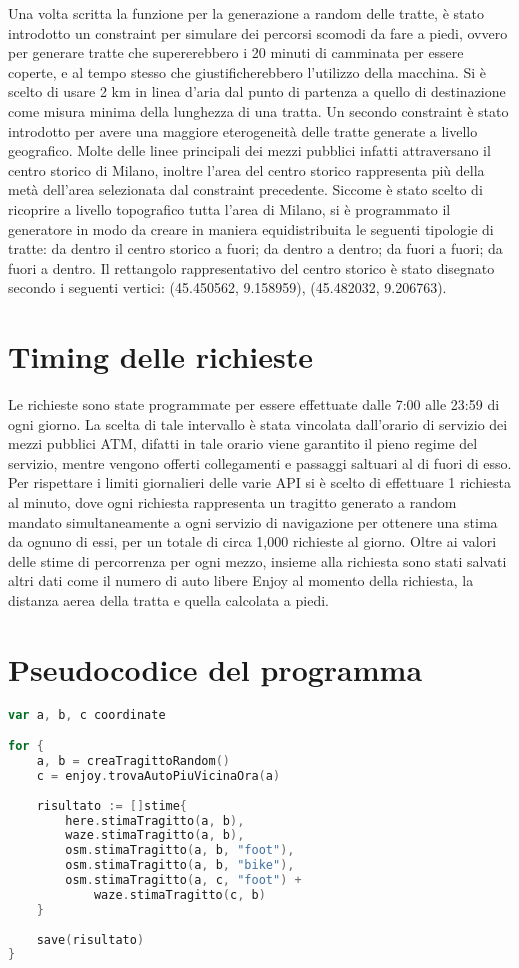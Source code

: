 Una volta scritta la funzione per la generazione a random delle tratte, è stato introdotto un constraint per simulare dei percorsi scomodi da fare a piedi, ovvero per generare tratte che supererebbero i 20 minuti di camminata per essere coperte, e al tempo stesso che giustificherebbero l'utilizzo della macchina. Si è scelto di usare 2 km in linea d'aria dal punto di partenza a quello di destinazione come misura minima della lunghezza di una tratta. Un secondo constraint è stato introdotto per avere una maggiore eterogeneità delle tratte generate a livello geografico. Molte delle linee principali dei mezzi pubblici infatti attraversano il centro storico di Milano, inoltre l'area del centro storico rappresenta più della metà dell'area selezionata dal constraint precedente. Siccome è stato scelto di ricoprire a livello topografico tutta l'area di Milano, si è programmato il generatore in modo da creare in maniera equidistribuita le seguenti tipologie di tratte: da dentro il centro storico a fuori; da dentro a dentro; da fuori a fuori; da fuori a dentro. Il rettangolo rappresentativo del centro storico è stato disegnato secondo i seguenti vertici: (45.450562\textdegree, 9.158959\textdegree), (45.482032\textdegree, 9.206763\textdegree).

\section{Timing delle richieste}

Le richieste sono state programmate per essere effettuate dalle 7:00 alle 23:59 di ogni giorno. La scelta di tale intervallo è stata vincolata dall'orario di servizio dei mezzi pubblici ATM, difatti in tale orario viene garantito il pieno regime del servizio, mentre vengono offerti collegamenti e passaggi saltuari al di fuori di esso.
Per rispettare i limiti giornalieri delle varie API si è scelto di effettuare 1 richiesta al minuto, dove ogni richiesta rappresenta un tragitto generato a random mandato simultaneamente a ogni servizio di navigazione per ottenere una stima da ognuno di essi, per un totale di circa 1,000 richieste al giorno. Oltre ai valori delle stime di percorrenza per ogni mezzo, insieme alla richiesta sono stati salvati altri dati come il numero di auto libere Enjoy al momento della richiesta, la distanza aerea della tratta e quella calcolata a piedi. 

\section{Pseudocodice del programma}

\begin{lstlisting}[language=Go]
var a, b, c coordinate

for {
	a, b = creaTragittoRandom()
	c = enjoy.trovaAutoPiuVicinaOra(a)
	
	risultato := []stime{
		here.stimaTragitto(a, b),
		waze.stimaTragitto(a, b),
		osm.stimaTragitto(a, b, "foot"),
		osm.stimaTragitto(a, b, "bike"),
		osm.stimaTragitto(a, c, "foot") +
			waze.stimaTragitto(c, b)
	}
	
	save(risultato)
}
\end{lstlisting}